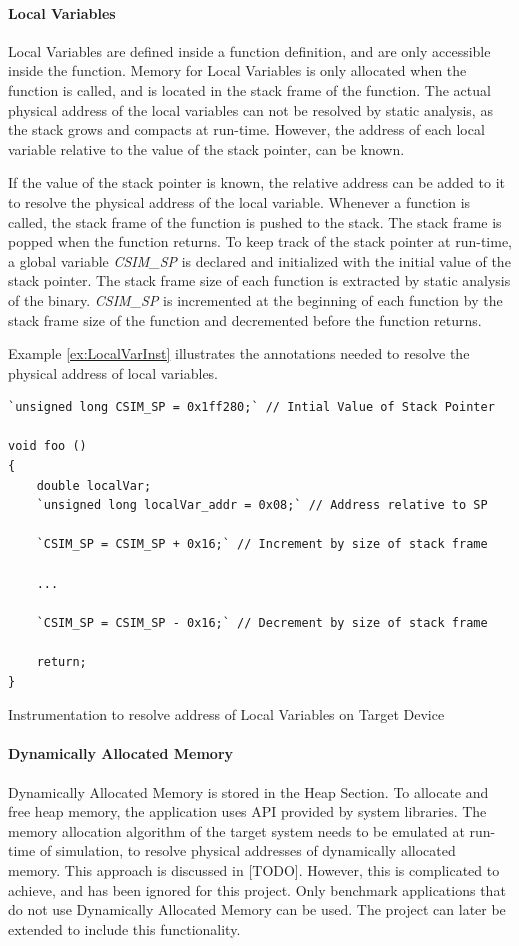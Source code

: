 \paragraph{Local Variables}
Local Variables are defined inside a function definition, and are only accessible inside the function. Memory for Local Variables is only allocated when the function is called, and is located in the stack frame of the function. The actual physical address of the local variables can not be resolved by static analysis, as the stack grows and compacts at run-time. However, the address of each local variable relative to the value of the stack pointer, can be known.

If the value of the stack pointer is known, the relative address can be added to it to resolve the physical address of the local variable. Whenever a function is called, the stack frame of the function is pushed to the stack. The stack frame is popped when the function returns. To keep track of the stack pointer at run-time, a global variable \emph{CSIM\_SP} is declared and initialized with the initial value of the stack pointer. The stack frame size of each function is extracted by static analysis of the binary. \emph{CSIM\_SP} is incremented at the beginning of each function by the stack frame size of the function and decremented before the function returns.

Example \ref{ex:LocalVarInst} illustrates the annotations needed to resolve the physical address of local variables.

\begin{Example}
\begin{lstlisting}[label=lst:LocalVarInst]
`unsigned long CSIM_SP = 0x1ff280;` // Intial Value of Stack Pointer

void foo ()
{
    double localVar;
    `unsigned long localVar_addr = 0x08;` // Address relative to SP

    `CSIM_SP = CSIM_SP + 0x16;` // Increment by size of stack frame
    
    ...
    
    `CSIM_SP = CSIM_SP - 0x16;` // Decrement by size of stack frame
    
    return;
}
\end{lstlisting}
\caption{Instrumentation to resolve address of Local Variables on Target Device}
\label{ex:LocalVarInst}
\end{Example}

\paragraph{Dynamically Allocated Memory}
Dynamically Allocated Memory is stored in the Heap Section. To allocate and free heap memory, the application uses API provided by system libraries. The memory allocation algorithm of the target system needs to be emulated at run-time of simulation, to resolve physical addresses of dynamically allocated memory. This approach is discussed in [TODO]. However, this is complicated to achieve, and has been ignored for this project. Only benchmark applications that do not use Dynamically Allocated Memory can be used. The project can later be extended to include this functionality.

